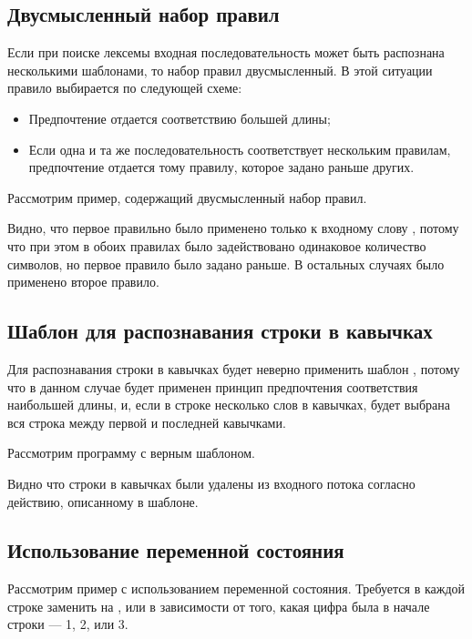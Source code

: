 \subsection{Двусмысленный набор правил}

Если при поиске лексемы входная последовательность может быть распознана несколькими шаблонами, то набор правил двусмысленный. В этой ситуации правило выбирается по следующей схеме:

\begin{itemize}
	\item Предпочтение отдается соответствию большей длины;
	\item Если одна и та же последовательность соответствует нескольким правилам, предпочтение отдается тому правилу, которое задано раньше других.
\end{itemize}

Рассмотрим пример, содержащий двусмысленный набор правил.



Видно, что первое правильно было применено только к входному слову , потому что при этом в обоих правилах было задействовано одинаковое количество символов, но первое правило было задано раньше. В остальных случаях было применено второе правило.

\subsection{Шаблон для распознавания строки в кавычках}

Для распознавания строки в кавычках будет неверно применить шаблон , потому что в данном случае будет применен принцип предпочтения соответствия наибольшей длины, и, если в строке несколько слов в кавычках, будет выбрана вся строка между первой и последней кавычками.

Рассмотрим программу с верным шаблоном.



Видно что строки в кавычках были удалены из входного потока согласно действию, описанному в шаблоне.

\subsection{Использование переменной состояния}

Рассмотрим пример с использованием переменной состояния. Требуется в каждой строке заменить  на ,  или  в зависимости от того, какая цифра была в начале строки — 1, 2, или 3.

